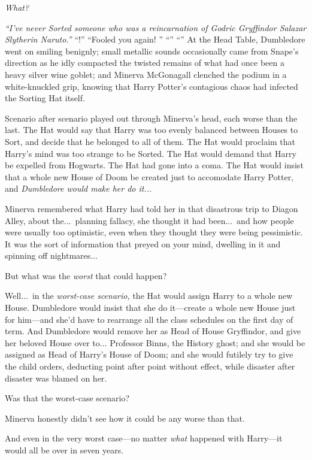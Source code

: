 \emph{What?}

\emph{“I’ve never Sorted someone who was a reincarnation of Godric Gryffindor  Salazar Slytherin  Naruto.”}
\sbreak
“!”
\sbreak
“Fooled you again! ”
\sbreak
“”
\sbreak
“”
\sbreak
At the Head Table, Dumbledore went on smiling benignly; small metallic sounds occasionally came from Snape’s direction as he idly compacted the twisted remains of what had once been a heavy silver wine goblet; and Minerva McGonagall clenched the podium in a white-knuckled grip, knowing that Harry Potter’s contagious chaos had infected the Sorting Hat itself.

Scenario after scenario played out through Minerva’s head, each worse than the last. The Hat would say that Harry was too evenly balanced between Houses to Sort, and decide that he belonged to all of them. The Hat would proclaim that Harry’s mind was too strange to be Sorted. The Hat would demand that Harry be expelled from Hogwarts. The Hat had gone into a coma. The Hat would insist that a whole new House of Doom be created just to accomodate Harry Potter, and \emph{Dumbledore would make her do it...}

Minerva remembered what Harry had told her in that disastrous trip to Diagon Alley, about the...\ planning fallacy, she thought it had been...\ and how people were usually too optimistic, even when they thought they were being pessimistic. It was the sort of information that preyed on your mind, dwelling in it and spinning off nightmares...

But what was the \emph{worst} that could happen?

Well...\ in the \emph{worst-case scenario,} the Hat would assign Harry to a whole new House. Dumbledore would insist that she do it—create a whole new House just for him—and she’d have to rearrange all the class schedules on the first day of term. And Dumbledore would remove her as Head of House Gryffindor, and give her beloved House over to... Professor Binns, the History ghost; and she would be assigned as Head of Harry’s House of Doom; and she would futilely try to give the child orders, deducting point after point without effect, while disaster after disaster was blamed on her.

Was that the worst-case scenario?

Minerva honestly didn’t see how it could be any worse than that.

And even in the very worst case—no matter \emph{what} happened with Harry—it would all be over in seven years.


